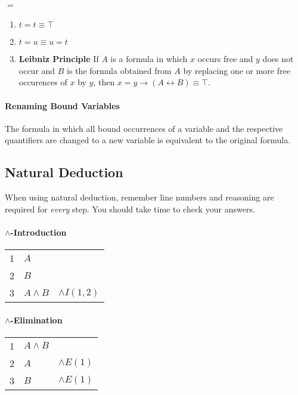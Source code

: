 \documentclass[10pt,twoside,twocolumn]{article}
\providecommand{\tabularnewline}{\\}
\begin{document}
\paragraph{$\boldsymbol{=}$}
\begin{enumerate}
\item $t=t\equiv\top$
\item $t=u\equiv u=t$
\item \textbf{Leibniz Principle} If $A$ is a formula in which $x$ occurs
free and $y$ does not occur and $B$ is the formula obtained from
$A$ by replacing one or more free occurences of $x$ by $y$, then
$x=y\rightarrow\left(A\leftrightarrow B\right)\equiv\top$.
\end{enumerate}

\paragraph{Renaming Bound Variables}

The formula in which all bound occurrences of a variable and the respective
quantifiers are changed to a new variable is equivalent to the original
formula.


\subsection{Natural Deduction}

When using natural deduction, remember line numbers and reasoning
are required for \emph{every} step. You should take time to check
your answers.


\paragraph{$\boldsymbol{\land}$-Introduction}

\begin{tabular}{llr}
1 & $A$ & \tabularnewline
2 & $B$ & \tabularnewline
3 & $A\land B$ & $\land I\left(1,2\right)$\tabularnewline
\end{tabular}


\paragraph{$\boldsymbol{\land}$-Elimination}

\begin{tabular}{llr}
1 & $A\land B$ & \tabularnewline
2 & $A$ & $\land E\left(1\right)$\tabularnewline
3 & $B$ & $\land E\left(1\right)$\tabularnewline
\end{tabular}
\end{document}
